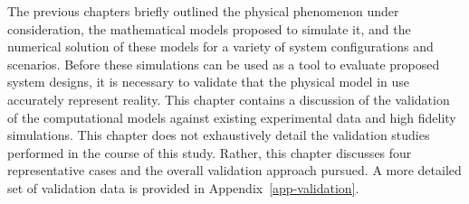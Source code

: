 
\label{sec:validation}

%
%
%

%
%

The previous chapters briefly outlined the physical phenomenon under
consideration, the mathematical models proposed to simulate it,
and the numerical solution of these models for a variety of system 
configurations and scenarios. Before these simulations can be used 
as a tool to evaluate proposed system designs, it is necessary to
validate that the physical model in use accurately represent
reality. This chapter contains a discussion of the validation of the
computational models against existing experimental data and high
fidelity simulations. This chapter does not exhaustively detail the
validation studies performed in the course of this study. Rather, this
chapter discusses four representative cases and the overall validation
approach pursued. A more detailed set of validation data is provided in 
Appendix~\ref{app-validation}.  

